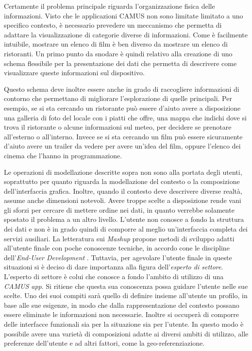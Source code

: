Certamente il problema principale riguarda l'organizzazione fisica delle informazioni. Visto che le applicazioni CAMUS non sono limitate limitato a uno specifico contesto, è necessario prevedere un meccanismo che permetta di adattare la visualizzazione di categorie diverse di informazioni. Come è facilmente intuibile, mostrare un elenco di film è ben diverso da mostrare un elenco di ristoranti. Un primo punto da snodare è quindi relativo alla creazione di uno schema flessibile per la presentazione dei dati che permetta di descrivere come visualizzare queste informazioni sul dispositivo.

Questo schema deve inoltre essere anche in grado di raccogliere informazioni di contorno che permettano di migliorare l'esplorazione di quelle principali. Per esempio, se si sta cercando un ristorante può essere d'aiuto avere a disposizione una galleria di foto del locale con i piatti che offre, una mappa che indichi dove si trova il ristorante o alcune informazioni sul meteo, per decidere se prenotare all'esterno o all'interno. Invece se si sta cercando un film può essere sicuramente d'aiuto avere un trailer da vedere per avere un'idea del film, oppure l'elenco dei cinema che l'hanno in programmazione.

Le operazioni di modellazione descritte sopra non sono alla portata degli utenti, soprattutto per quanto riguarda la modellazione del contesto o la composizione dell'interfaccia grafica. Inoltre, quando il contesto deve descrivere diverse realtà, assume anche dimensioni notevoli. Avere troppe scelte a disposizione rende vani gli sforzi per cercare di mettere ordine nei dati, in quanto verrebbe solamente spostato il problema a un altro livello. L'utente non conosce a fondo la struttura dei dati e non è in grado quindi di comporre al meglio un'interfaccia completa dei servizi ausiliari. La letteratura sui \textit{Mashup} propone metodi di sviluppo adatti all'utente finale con poche conoscenze tecniche, in accordo cone le discipline dell'\emph{End-User Development} \cite{Cappiello:2015:UAE:2788341.2735632}. Tuttavia, per agevolare l'utente finale in queste situazioni si è deciso di dare importanza alla figura dell'\emph{esperto di settore}. L'esperto di settore è colui che conosce a fondo l'ambito di utilizzo di una \emph{CAMUS app}. Si ritiene che questa sua conoscenza possa guidare l'utente nelle sue scelte. Uno dei suoi compiti sarà quello di definire insieme all'utente un profilo, in base alle sue esigenze, in modo che dalla rappresentazione del contesto possano essere eliminate le informazioni non necessarie. Inoltre si occuperà di comporre delle interfacce funzionali sia per la situazione sia per l'utente. In questo modo è possibile avere una varietà di composizioni adatte ai diversi ambiti di utilizzo, alle preferenze dell'utente e ad altri fattori, come la geo-referenziazione.

